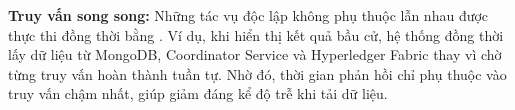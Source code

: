 \textbf{Truy vấn song song:} Những tác vụ độc lập không phụ thuộc lẫn nhau được thực thi đồng thời bằng . Ví dụ, khi hiển thị kết quả bầu cử, hệ thống đồng thời lấy dữ liệu từ MongoDB, Coordinator Service và Hyperledger Fabric thay vì chờ từng truy vấn hoàn thành tuần tự. Nhờ đó, thời gian phản hồi chỉ phụ thuộc vào truy vấn chậm nhất, giúp giảm đáng kể độ trễ khi tải dữ liệu.
